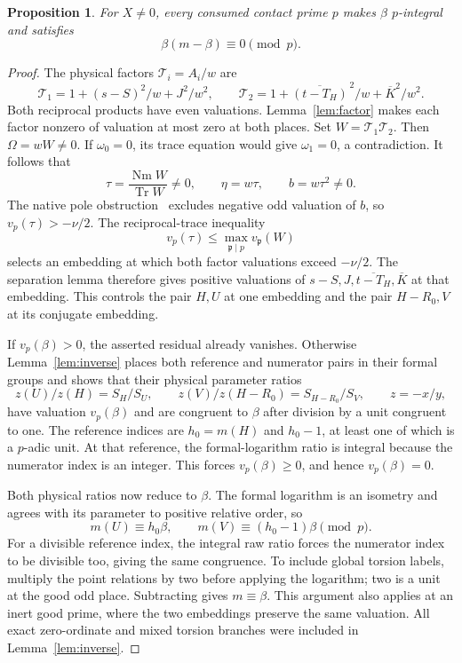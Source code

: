 \documentclass[11pt,a4paper]{article}
\newtheorem{proposition}[theorem]{Proposition}
\DeclareMathOperator{\Tr}{Tr}\DeclareMathOperator{\Nm}{Nm}
\begin{document}
\begin{proposition}\label{prop:local}
For $X\ne0$, every consumed contact prime $p$ makes $\beta$
$p$-integral and satisfies
\[
                            \beta(m-\beta)\equiv0\pmod p.
\]
\end{proposition}
\begin{proof}
The physical factors $\mathcal T_i=A_i/w$ are
\[
 \mathcal T_1=1+(s-S)^2/w+J^2/w^2,\qquad
 \mathcal T_2=1+\overline{(t-T_H)}^{\,2}/w+\overline K^2/w^2.
\]
Both reciprocal products have even valuations.
Lemma~\ref{lem:factor} makes each factor nonzero of valuation at
most zero at both places. Set $W=\mathcal T_1\mathcal T_2$.
Then $\Omega=wW\ne0$. If $\omega_0=0$, its trace equation would
give $\omega_1=0$, a contradiction. It follows that
\begin{equation}\label{eq:physical}
 \tau=\frac{\Nm W}{\Tr W}\ne0,\qquad
                         \eta=w\tau,\qquad b=w\tau^2\ne0.
\end{equation}
The native pole obstruction~\cite{Pole} excludes negative odd
valuation of $b$, so $v_p(\tau)>-\nu/2$. The reciprocal-trace
inequality
\[
 v_p(\tau)\le\max_{\mathfrak p\mid p}v_{\mathfrak p}(W)
\]
selects an embedding at which both factor valuations exceed
$-\nu/2$. The separation lemma therefore gives positive valuations
of $s-S,J,\overline{t-T_H},\overline K$ at that embedding.
This controls the pair $H,U$ at one embedding and the pair
$H-R_0,V$ at its conjugate embedding.

If $v_p(\beta)>0$, the asserted residual already vanishes.
Otherwise Lemma~\ref{lem:inverse} places both reference and
numerator pairs in their formal groups and shows that their
physical parameter ratios
\[
             z(U)/z(H)=S_H/S_U,\qquad
             z(V)/z(H-R_0)=S_{H-R_0}/S_V,\qquad z=-x/y,
\]
have valuation $v_p(\beta)$ and are congruent to $\beta$ after
division by a unit congruent to one. The reference indices are
$h_0=m(H)$ and $h_0-1$, at least one of which is a $p$-adic unit.
At that reference, the formal-logarithm ratio is integral because
the numerator index is an integer. This forces $v_p(\beta)\ge0$,
and hence $v_p(\beta)=0$.

Both physical ratios now reduce to $\beta$. The formal logarithm
is an isometry and agrees with its parameter to positive relative
order, so
\[
 m(U)\equiv h_0\beta,\qquad m(V)\equiv(h_0-1)\beta\pmod p.
\]
For a divisible reference index, the integral raw ratio forces
the numerator index to be divisible too, giving the same congruence.
To include global torsion labels, multiply the point relations by
two before applying the logarithm; two is a unit at the good odd
place. Subtracting gives $m\equiv\beta$. This argument also applies
at an inert good prime, where the two embeddings preserve the
same valuation. All exact zero-ordinate and mixed torsion branches
were included in Lemma~\ref{lem:inverse}.
\end{proof}
\end{document}
